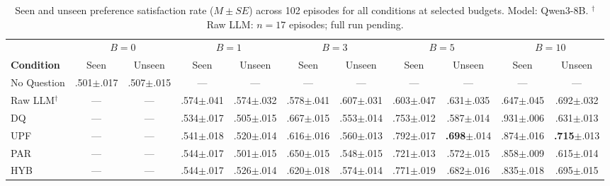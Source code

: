 \documentclass[manuscript,review,anonymous]{acmart}
\begin{document}
\begin{table}[h]
\centering
\caption{Seen and unseen preference satisfaction rate ($M \pm SE$) across 102 episodes for all conditions at selected budgets. Model: Qwen3-8B\@. $^\dagger$Raw LLM\@: $n=17$ episodes; full run pending.}
\label{tab:qwen3-results}
\begin{tabular}{l cc cc cc cc cc}
\toprule
 & \multicolumn{2}{c}{$B=0$} & \multicolumn{2}{c}{$B=1$} & \multicolumn{2}{c}{$B=3$} & \multicolumn{2}{c}{$B=5$} & \multicolumn{2}{c}{$B=10$} \\
\cmidrule(lr){2-3} \cmidrule(lr){4-5} \cmidrule(lr){6-7} \cmidrule(lr){8-9} \cmidrule(lr){10-11}
\textbf{Condition} & Seen & Unseen & Seen & Unseen & Seen & Unseen & Seen & Unseen & Seen & Unseen \\
\midrule
No Question      & .501{\scriptsize$\pm$.017} & .507{\scriptsize$\pm$.015} & --- & --- & --- & --- & --- & --- & --- & --- \\
Raw LLM$^\dagger$ & --- & --- & .574{\scriptsize$\pm$.041} & .574{\scriptsize$\pm$.032} & .578{\scriptsize$\pm$.041} & .607{\scriptsize$\pm$.031} & .603{\scriptsize$\pm$.047} & .631{\scriptsize$\pm$.035} & .647{\scriptsize$\pm$.045} & .692{\scriptsize$\pm$.032} \\
DQ               & --- & --- & .534{\scriptsize$\pm$.017} & .505{\scriptsize$\pm$.015} & .667{\scriptsize$\pm$.015} & .553{\scriptsize$\pm$.014} & .753{\scriptsize$\pm$.012} & .587{\scriptsize$\pm$.014} & .931{\scriptsize$\pm$.006} & .631{\scriptsize$\pm$.013} \\
UPF              & --- & --- & .541{\scriptsize$\pm$.018} & .520{\scriptsize$\pm$.014} & .616{\scriptsize$\pm$.016} & .560{\scriptsize$\pm$.013} & .792{\scriptsize$\pm$.017} & \textbf{.698}{\scriptsize$\pm$.014} & .874{\scriptsize$\pm$.016} & \textbf{.715}{\scriptsize$\pm$.013} \\
PAR              & --- & --- & .544{\scriptsize$\pm$.017} & .501{\scriptsize$\pm$.015} & .650{\scriptsize$\pm$.015} & .548{\scriptsize$\pm$.015} & .721{\scriptsize$\pm$.013} & .572{\scriptsize$\pm$.015} & .858{\scriptsize$\pm$.009} & .615{\scriptsize$\pm$.014} \\
HYB              & --- & --- & .544{\scriptsize$\pm$.017} & .526{\scriptsize$\pm$.014} & .620{\scriptsize$\pm$.018} & .574{\scriptsize$\pm$.014} & .771{\scriptsize$\pm$.019} & .682{\scriptsize$\pm$.016} & .835{\scriptsize$\pm$.018} & .695{\scriptsize$\pm$.015} \\
\bottomrule
\end{tabular}
\end{table}
\end{document}
